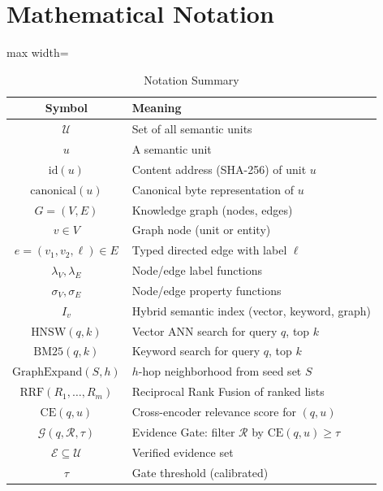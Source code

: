﻿%

\section{Mathematical Notation}
\label{app:notation}

\begin{table}[htbp]
\centering
\caption{Notation Summary}
\label{tab:notation}
\begin{adjustbox}{max width=\textwidth}
\begin{tabular}{cl}
\toprule
\textbf{Symbol} & \textbf{Meaning} \\
\midrule
$\mathcal{U}$ & Set of all semantic units \\
$u$ & A semantic unit \\
$\text{id}(u)$ & Content address (SHA-256) of unit $u$ \\
$\text{canonical}(u)$ & Canonical byte representation of $u$ \\
$G = (V, E)$ & Knowledge graph (nodes, edges) \\
$v \in V$ & Graph node (unit or entity) \\
$e = (v_1, v_2, \ell) \in E$ & Typed directed edge with label $\ell$ \\
$\lambda_V, \lambda_E$ & Node/edge label functions \\
$\sigma_V, \sigma_E$ & Node/edge property functions \\
$I_v$ & Hybrid semantic index (vector, keyword, graph) \\
$\text{HNSW}(q, k)$ & Vector ANN search for query $q$, top $k$ \\
$\text{BM25}(q, k)$ & Keyword search for query $q$, top $k$ \\
$\text{GraphExpand}(S, h)$ & $h$-hop neighborhood from seed set $S$ \\
$\text{RRF}(R_1, \dots, R_m)$ & Reciprocal Rank Fusion of ranked lists \\
$\text{CE}(q, u)$ & Cross-encoder relevance score for $(q, u)$ \\
$\mathcal{G}(q, \mathcal{R}, \tau)$ & Evidence Gate: filter $\mathcal{R}$ by $\text{CE}(q, u) \geq \tau$ \\
$\mathcal{E} \subseteq \mathcal{U}$ & Verified evidence set \\
$\tau$ & Gate threshold (calibrated) \\

\end{tabular}
\end{adjustbox}
\end{table}
